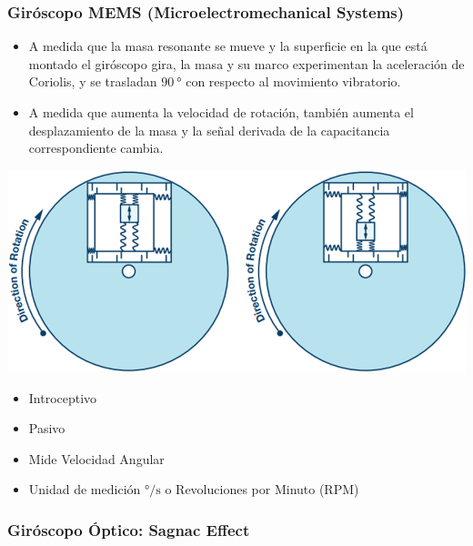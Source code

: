 \begin{frame}
    \frametitle{Giróscopo MEMS (Microelectromechanical Systems)}
    \scriptsize
        
    \begin{itemize}
        \item A medida que la masa resonante se mueve y la superficie en la que está montado el giróscopo gira, la masa y su marco experimentan la aceleración de Coriolis, y se trasladan $\SI{90}{\degree}$ con respecto al movimiento vibratorio.
        
        \item A medida que aumenta la velocidad de rotación, también aumenta el desplazamiento de la masa y la señal derivada de la capacitancia correspondiente cambia.
    \end{itemize}
    
    \begin{center}
        \includegraphics[width=0.5\columnwidth]{images/gyroscope_mems_3.png}
    \end{center}
    
    \begin{center}
        
    \end{center}
    
    \begin{itemize}
        \item Introceptivo
        \item Pasivo
        \item Mide Velocidad Angular
        \item Unidad de medición $\si{\degree\per\second}$ o Revoluciones por Minuto (RPM)
    \end{itemize}

\end{frame}

\begin{frame}
    \frametitle{Giróscopo Óptico: Sagnac Effect}
    \scriptsize
    
    
\end{frame}


